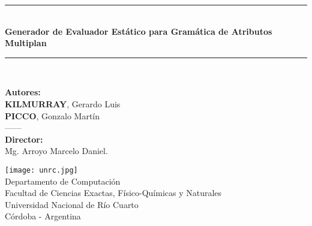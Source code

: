 \newcommand{\HRule}{\rule{\linewidth}{0.6mm}}
\begin{titlepage}

\begin{center}


\vspace*{1cm}
\HRule \\[0.5cm]
{ \huge{\textbf{\sc Generador de Evaluador Estático para Gramática de Atributos Multiplan}}}\\[0.4cm]
 
\HRule \\[1.2cm]



\vspace*{1.2cm}

\Large{\textbf{Autores:}\\ \textbf{KILMURRAY}, Gerardo Luis\\ \textbf{PICCO}, Gonzalo Martín\\}
\vspace*{1cm}
{------\\}
\vspace*{1cm}
\textbf{Director:}\\ Mg. Arroyo Marcelo Daniel.

\vspace*{1.5cm}
 \texttt{[image: unrc.jpg]}\\
\vspace*{1cm}
\large{Departamento de Computación\\
       Facultad de Ciencias Exactas, Físico-Químicas y Naturales\\
       Universidad Nacional de Río Cuarto\\
       Córdoba - Argentina}

\end{center}
\end{titlepage}
\sloppy

\titlepage
